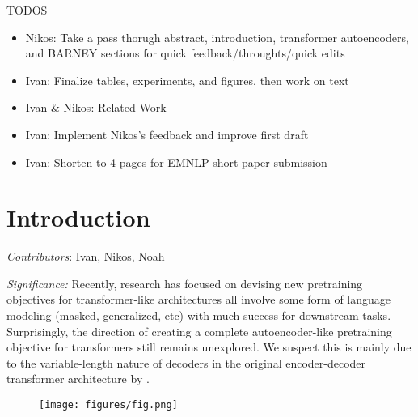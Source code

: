 {\color{red}TODOS
\begin{itemize}
    \item Nikos: Take a pass thorugh abstract, introduction, transformer autoencoders, and BARNEY sections for quick feedback/throughts/quick edits 
    \item Ivan: Finalize tables, experiments, and figures, then work on text
    \item Ivan $\&$ Nikos: Related Work 
    \item Ivan: Implement Nikos's feedback and improve first draft
    \item Ivan: Shorten to 4 pages for EMNLP short paper submission
\end{itemize}
}

\section{Introduction} 
{\textit{Contributors}}: Ivan, Nikos, Noah

\vspace{3mm} 
\noindent \textit{Significance:} Recently, research has focused on devising new pretraining objectives for transformer-like architectures all involve some form of  language modeling (masked, generalized, etc) with much success for downstream tasks. Surprisingly, the direction of creating a complete autoencoder-like pretraining objective for transformers  still remains unexplored. We suspect this is mainly due to the variable-length nature of decoders in the original encoder-decoder transformer architecture by \citet{vaswani17}.

\begin{figure}[ht]
\centering
\hspace{-2mm}\texttt{[image: figures/fig.png]}
\caption{}
\end{figure}


